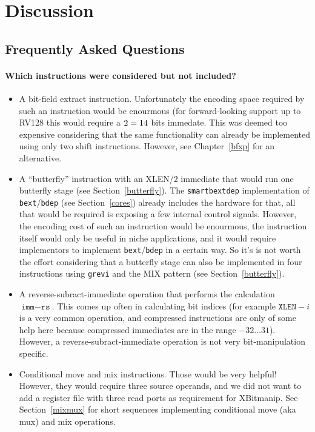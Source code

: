 \chapter{Discussion}

\section{Frequently Asked Questions}

\subsubsection{Which instructions were considered but not included?}

\begin{itemize}
\item A bit-field extract instruction. Unfortunately the encoding space required
by such an instruction would be enourmous (for forward-looking support up to
RV128 this would require a $2 \time 7 = 14$ bits immedate. This was deemed
too expensive considering that the same functionality can already be implemented
using only two shift instructions. However, see Chapter~\ref{bfxp} for an
alternative.

\item A ``butterfly'' instruction with an XLEN/2 immediate that would run one
butterfly stage (see Section~\ref{butterfly}). The {\tt smartbextdep} implementation
of {\tt bext}/{\tt bdep} (see Section~\ref{cores}) already includes the hardware
for that, all that would be required is exposing a few internal control signals.
However, the encoding cost of such an instruction would be enourmous, the
instruction itself would only be useful in niche applications, and it would require
implementors to implement {\tt bext}/{\tt bdep} in a certain way. So it's is
not worth the effort considering that a butterfly stage can also be implemented in
four instructions using {\tt grevi} and the MIX pattern (see Section~\ref{butterfly}).

\item A reverse-subract-immediate operation that performs the calculation
$\texttt{imm} - \texttt{rs}$.  This comes up often in calculating bit indices
(for example $\texttt{XLEN} - i$ is a very common operation, and compressed
instructions are only of some help here because compressed immediates are in
the range $-32 \dots 31$). However, a reverse-subract-immediate operation is
not very bit-manipulation specific.

\item Conditional move and mix instructions. Those would be very helpful! However,
they would require three source operands, and we did not want to add a register
file with three read ports as requirement for XBitmanip. See Section~\ref{mixmux}
for short sequences implementing conditional move (aka mux) and mix operations.


\end{itemize}
